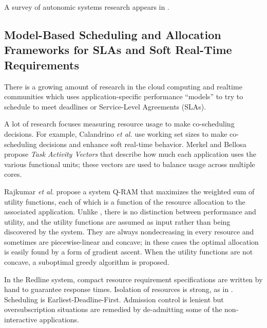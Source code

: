 %


A survey of autonomic systems research appears in \cite{1380585}.

\subsection{Model-Based Scheduling and Allocation Frameworks for SLAs and Soft Real-Time Requirements}

There is a growing amount of research in the cloud computing and realtime communities which uses application-specific performance ``models'' to try to schedule to meet deadlines or Service-Level Agreements (SLAs).

A lot of research focuses measuring resource usage to make co-scheduling decisions.
For example, Calandrino \emph{et al.}\cite{unc} use working set sizes to make co-scheduling decisions and enhance soft real-time behavior. Merkel and Bellosa\cite{merkel-eurosys08} propose \emph{Task Activity Vectors} that describe how much each application uses the various functional units; these vectors are used to balance usage across multiple cores.


Rajkumar \emph{et al.}\cite{828990} propose a system Q-RAM that maximizes the weighted sum of utility functions,
each of which is a function of the resource allocation to the associated application.
Unlike \pacora, there is no distinction between performance and utility, and
the utility functions are assumed as input rather than being discovered by the system.
They are always nondecreasing in every resource and sometimes are piecewise-linear and concave;
in these cases the optimal allocation is easily found by a form of gradient ascent.
When the utility functions are not concave, a suboptimal greedy algorithm is proposed.



%
In the Redline system\cite{Redline}, compact resource requirement specifications are written by hand to guarantee response times.
Isolation of resources is strong, as in \pacora.  Scheduling is Earliest-Deadline-First.
Admission control is lenient but oversubscription situations are remedied by de-admitting some of the non-interactive applications.

